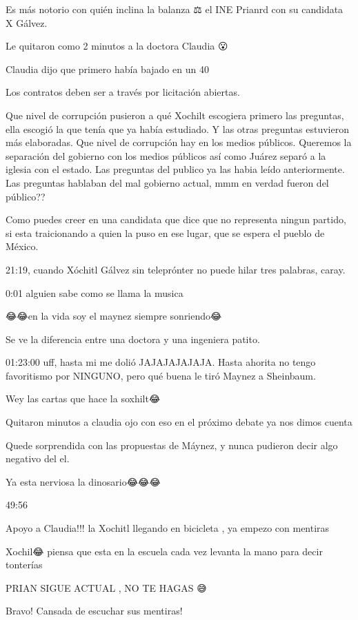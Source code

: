 Es más notorio con quién inclina la balanza ⚖️ el INE Prianrd con su candidata X Gálvez.

Le quitaron como 2 minutos a la doctora Claudia 😮

Claudia dijo que primero había bajado en un 40%

Los contratos deben ser a través por licitación abiertas.

Que nivel de corrupción pusieron a qué Xochilt escogiera  primero las preguntas, ella escogió la que tenía que ya había estudiado. Y las otras preguntas estuvieron más elaboradas. Que nivel de corrupción hay en los medios públicos. Queremos la separación del gobierno con los medios públicos así como Juárez separó a la iglesia con el estado. Las preguntas del publico ya las habia leído anteriormente. Las preguntas hablaban del mal gobierno actual, mmm en verdad fueron del público??

Como puedes creer en una candidata que dice  que no representa ningun partido, si esta traicionando a quien la puso en ese lugar, que se espera el pueblo de México.

21:19, cuando Xóchitl Gálvez sin teleprónter no puede hilar tres palabras, caray.

0:01 alguien sabe como se llama la musica

😂😂en la vida soy el maynez siempre sonriendo😂

Se ve la diferencia entre una doctora y una ingeniera patito.

01:23:00 uff, hasta mi me dolió JAJAJAJAJAJA.
Hasta ahorita no tengo favoritismo por NINGUNO, pero qué buena le tiró Maynez a Sheinbaum.

Wey las cartas que hace la soxhilt😂

Quitaron minutos a claudia ojo con eso en el próximo debate ya nos dimos cuenta

Quede sorprendida con las propuestas de Máynez, y nunca pudieron decir algo negativo del el.

Ya esta nerviosa la dinosario😂😂😂

49:56

Apoyo a Claudia!!! la Xochitl llegando en bicicleta , ya empezo con mentiras

Xochil😂 piensa que esta en la escuela cada vez levanta la mano para decir tonterías

PRIAN SIGUE ACTUAL , NO TE HAGAS 😅

Bravo! Cansada de escuchar sus mentiras!

